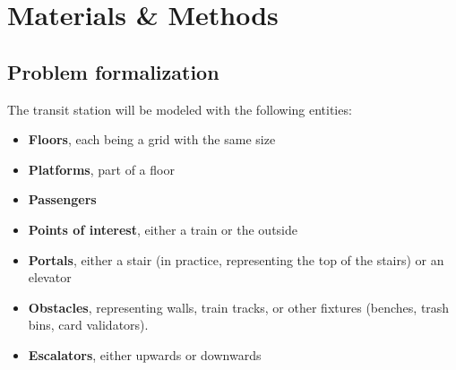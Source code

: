 \section{Materials \& Methods} \label{sec:methods_materials}

\subsection{Problem formalization}

The transit station will be modeled with the following entities:
\begin{itemize}
    \item \textbf{Floors}, each being a grid with the same size
    \item \textbf{Platforms}, part of a floor
    \item \textbf{Passengers}
    \item \textbf{Points of interest}, either a train or the outside
    \item \textbf{Portals}, either a stair (in practice, representing the top of the stairs) or an elevator
    \item \textbf{Obstacles}, representing walls, train tracks, or other fixtures (benches, trash bins, card validators).
    \item \textbf{Escalators}, either upwards or downwards
\end{itemize}

